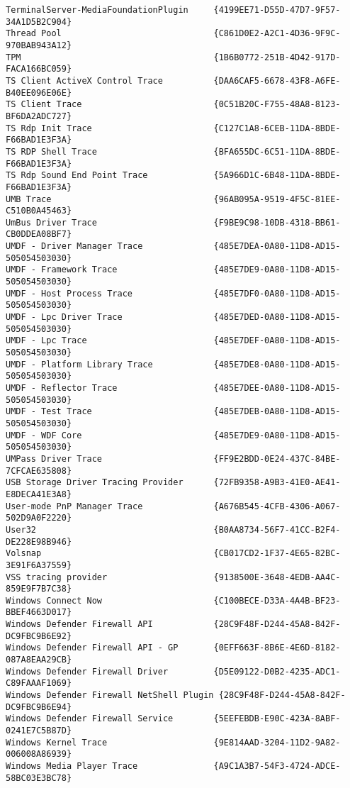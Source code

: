 \documentclass{report}
\begin{document}
\begin{lstlisting}[breaklines=true,basicstyle=\tiny]
TerminalServer-MediaFoundationPlugin     {4199EE71-D55D-47D7-9F57-34A1D5B2C904}
Thread Pool                              {C861D0E2-A2C1-4D36-9F9C-970BAB943A12}
TPM                                      {1B6B0772-251B-4D42-917D-FACA166BC059}
TS Client ActiveX Control Trace          {DAA6CAF5-6678-43F8-A6FE-B40EE096E06E}
TS Client Trace                          {0C51B20C-F755-48A8-8123-BF6DA2ADC727}
TS Rdp Init Trace                        {C127C1A8-6CEB-11DA-8BDE-F66BAD1E3F3A}
TS RDP Shell Trace                       {BFA655DC-6C51-11DA-8BDE-F66BAD1E3F3A}
TS Rdp Sound End Point Trace             {5A966D1C-6B48-11DA-8BDE-F66BAD1E3F3A}
UMB Trace                                {96AB095A-9519-4F5C-81EE-C510B0A45463}
UmBus Driver Trace                       {F9BE9C98-10DB-4318-BB61-CB0DDEA08BF7}
UMDF - Driver Manager Trace              {485E7DEA-0A80-11D8-AD15-505054503030}
UMDF - Framework Trace                   {485E7DE9-0A80-11D8-AD15-505054503030}
UMDF - Host Process Trace                {485E7DF0-0A80-11D8-AD15-505054503030}
UMDF - Lpc Driver Trace                  {485E7DED-0A80-11D8-AD15-505054503030}
UMDF - Lpc Trace                         {485E7DEF-0A80-11D8-AD15-505054503030}
UMDF - Platform Library Trace            {485E7DE8-0A80-11D8-AD15-505054503030}
UMDF - Reflector Trace                   {485E7DEE-0A80-11D8-AD15-505054503030}
UMDF - Test Trace                        {485E7DEB-0A80-11D8-AD15-505054503030}
UMDF - WDF Core                          {485E7DE9-0A80-11D8-AD15-505054503030}
UMPass Driver Trace                      {FF9E2BDD-0E24-437C-84BE-7CFCAE635808}
USB Storage Driver Tracing Provider      {72FB9358-A9B3-41E0-AE41-E8DECA41E3A8}
User-mode PnP Manager Trace              {A676B545-4CFB-4306-A067-502D9A0F2220}
User32                                   {B0AA8734-56F7-41CC-B2F4-DE228E98B946}
Volsnap                                  {CB017CD2-1F37-4E65-82BC-3E91F6A37559}
VSS tracing provider                     {9138500E-3648-4EDB-AA4C-859E9F7B7C38}
Windows Connect Now                      {C100BECE-D33A-4A4B-BF23-BBEF4663D017}
Windows Defender Firewall API            {28C9F48F-D244-45A8-842F-DC9FBC9B6E92}
Windows Defender Firewall API - GP       {0EFF663F-8B6E-4E6D-8182-087A8EAA29CB}
Windows Defender Firewall Driver         {D5E09122-D0B2-4235-ADC1-C89FAAAF1069}
Windows Defender Firewall NetShell Plugin {28C9F48F-D244-45A8-842F-DC9FBC9B6E94}
Windows Defender Firewall Service        {5EEFEBDB-E90C-423A-8ABF-0241E7C5B87D}
Windows Kernel Trace                     {9E814AAD-3204-11D2-9A82-006008A86939}
Windows Media Player Trace               {A9C1A3B7-54F3-4724-ADCE-58BC03E3BC78}

\end{lstlisting}
\end{document}

